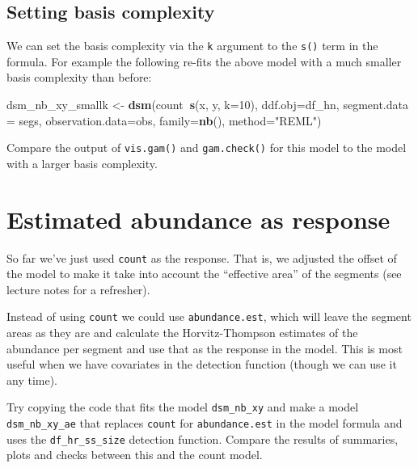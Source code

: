 \documentclass[]{book}
\newenvironment{Shaded}{\begin{snugshade}}{\end{snugshade}}
\newcommand{\KeywordTok}[1]{\textcolor[rgb]{0.13,0.29,0.53}{\textbf{#1}}}
\newcommand{\DataTypeTok}[1]{\textcolor[rgb]{0.13,0.29,0.53}{#1}}
\newcommand{\DecValTok}[1]{\textcolor[rgb]{0.00,0.00,0.81}{#1}}
\newcommand{\StringTok}[1]{\textcolor[rgb]{0.31,0.60,0.02}{#1}}
\newcommand{\OperatorTok}[1]{\textcolor[rgb]{0.81,0.36,0.00}{\textbf{#1}}}
\newcommand{\NormalTok}[1]{#1}
\theoremstyle{definition}
\theoremstyle{definition}
\theoremstyle{remark}
\begin{document}
\subsection{Setting basis complexity}\label{setting-basis-complexity}

We can set the basis complexity via the \texttt{k} argument to the
\texttt{s()} term in the formula. For example the following re-fits the
above model with a much smaller basis complexity than before:

\begin{Shaded}
\begin{Highlighting}[]
\NormalTok{dsm_nb_xy_smallk <-}\StringTok{ }\KeywordTok{dsm}\NormalTok{(count}\OperatorTok{~}\KeywordTok{s}\NormalTok{(x, y, }\DataTypeTok{k=}\DecValTok{10}\NormalTok{),}
                        \DataTypeTok{ddf.obj=}\NormalTok{df_hn, }\DataTypeTok{segment.data =}\NormalTok{ segs, }\DataTypeTok{observation.data=}\NormalTok{obs,}
                        \DataTypeTok{family=}\KeywordTok{nb}\NormalTok{(), }\DataTypeTok{method=}\StringTok{"REML"}\NormalTok{)}
\end{Highlighting}
\end{Shaded}

Compare the output of \texttt{vis.gam()} and \texttt{gam.check()} for
this model to the model with a larger basis complexity.

\section{Estimated abundance as
response}\label{estimated-abundance-as-response}

So far we've just used \texttt{count} as the response. That is, we
adjusted the offset of the model to make it take into account the
``effective area'' of the segments (see lecture notes for a refresher).

Instead of using \texttt{count} we could use \texttt{abundance.est},
which will leave the segment areas as they are and calculate the
Horvitz-Thompson estimates of the abundance per segment and use that as
the response in the model. This is most useful when we have covariates
in the detection function (though we can use it any time).

Try copying the code that fits the model \texttt{dsm\_nb\_xy} and make a
model \texttt{dsm\_nb\_xy\_ae} that replaces \texttt{count} for
\texttt{abundance.est} in the model formula and uses the
\texttt{df\_hr\_ss\_size} detection function. Compare the results of
summaries, plots and checks between this and the count model.
\end{document}
